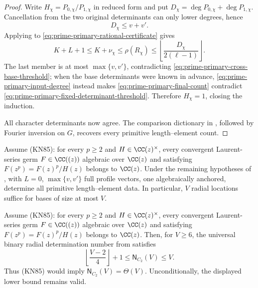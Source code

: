 \begin{proof}
Write \(H_\chi=P_{0,\chi}/P_{1,\chi}\) in reduced form and put
\(D_\chi=\deg P_{0,\chi}+\deg P_{1,\chi}\).  Cancellation from the two
original determinants can only lower degrees, hence
\begin{equation}\label{eq:prime-primary-input-degree}
 D_\chi\le v+v'.
\end{equation}
Applying  to
\eqref{eq:prime-primary-rational-certificate} gives
\begin{equation}\label{eq:prime-primary-final-count}
 K+L+1\le K+\nu_\chi
 \le\rho(R_\chi)
 \le\left\lfloor\frac{D_\chi}{2(\ell-1)}\right\rfloor.
\end{equation}
The last member is at most \(\max\{v,v'\}\), contradicting
\eqref{eq:prime-primary-cross-base-threshold}; when the base determinants were
known in advance, \eqref{eq:prime-primary-input-degree} instead makes
\eqref{eq:prime-primary-final-count} contradict
\eqref{eq:prime-primary-fixed-determinant-threshold}.  Therefore
\(H_\chi=1\), closing the induction.

All character determinants now agree.  The comparison dictionary in
, followed by Fourier inversion on \(G\),
recovers every primitive length--element count.
\end{proof}

\begin{corollary}
\label{cor:prime-primary-linear-radial-determination}
Assume \textup{(KN85)}: for every \(p\ge2\) and
\(H\in\CC(z)^\times\), every convergent Laurent-series germ
\(F\in\CC((z))\) algebraic over \(\CC(z)\) and satisfying
\(F(z^p)=F(z)^p/H(z)\) belongs to \(\CC(z)\).  Under the remaining
hypotheses of , with \(L=0\),
\(\max\{v,v'\}\) full profile vectors, one algebraically anchored, determine
all primitive length--element data.  In particular, \(V\) radial locations
suffice for bases of size at most \(V\).
\end{corollary}

\begin{corollary}
\label{cor:exact-binary-radial-sampling-order}
Assume \textup{(KN85)}: for every \(p\ge2\) and
\(H\in\CC(z)^\times\), every convergent Laurent-series germ
\(F\in\CC((z))\) algebraic over \(\CC(z)\) and satisfying
\(F(z^p)=F(z)^p/H(z)\) belongs to \(\CC(z)\).  Then, for \(V\ge6\),
the universal binary radial determination number from
 satisfies
\begin{equation}\label{eq:exact-binary-radial-sampling-order}
 \left\lfloor\frac{V-2}{4}\right\rfloor+1
 \le\mathsf N_{C_2}(V)\le V.
\end{equation}
Thus \textup{(KN85)} would imply
\(\mathsf N_{C_2}(V)=\Theta(V)\).  Unconditionally, the displayed lower
bound remains valid.
\end{corollary}

